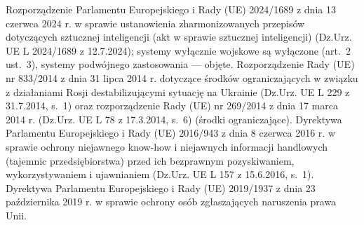 \begin{BibList}
 Rozporządzenie Parlamentu Europejskiego i Rady (UE) 2024/1689 z dnia 13 czerwca 2024 r. w sprawie ustanowienia zharmonizowanych przepisów dotyczących sztucznej inteligencji (akt w sprawie sztucznej inteligencji) (Dz.Urz. UE L 2024/1689 z 12.7.2024); systemy wyłącznie wojskowe są wyłączone (art.~2 ust.~3), systemy podwójnego zastosowania --- objęte.
 Rozporządzenie Rady (UE) nr 833/2014 z dnia 31 lipca 2014 r. dotyczące środków ograniczających w związku z działaniami Rosji destabilizującymi sytuację na Ukrainie (Dz.Urz. UE L 229 z 31.7.2014, s.~1) oraz rozporządzenie Rady (UE) nr 269/2014 z dnia 17 marca 2014 r. (Dz.Urz. UE L 78 z 17.3.2014, s.~6) (środki ograniczające).
 Dyrektywa Parlamentu Europejskiego i Rady (UE) 2016/943 z dnia 8 czerwca 2016 r. w sprawie ochrony niejawnego know-how i niejawnych informacji handlowych (tajemnic przedsiębiorstwa) przed ich bezprawnym pozyskiwaniem, wykorzystywaniem i ujawnianiem (Dz.Urz. UE L 157 z 15.6.2016, s.~1).
 Dyrektywa Parlamentu Europejskiego i Rady (UE) 2019/1937 z dnia 23 października 2019 r. w sprawie ochrony osób zgłaszających naruszenia prawa Unii.
\end{BibList}


